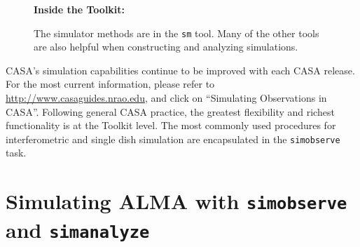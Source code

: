 \begin{wrapfigure}{r}{2.5in}
 \begin{boxedminipage}{2.5in}
    \centerline{\bf Inside the Toolkit:}
    The simulator methods are in the {\tt sm} tool.
    Many of the other tools are also helpful when
    constructing and analyzing simulations.
 \end{boxedminipage}
\end{wrapfigure}

CASA's simulation capabilities continue to be improved with each CASA release.
For the most current information, please refer to
\url{http://www.casaguides.nrao.edu}, and click on
``Simulating Observations in CASA''.
%
Following general CASA practice, the greatest flexibility and richest
functionality is at the Toolkit level.  The most commonly used
procedures for interferometric and single dish simulation are
encapsulated in the {\tt simobserve} task.

\section{Simulating ALMA with {\tt simobserve} and {\tt simanalyze}}
\label{section:sim.almasimmos}

